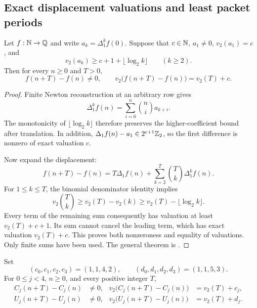 \subsection{Exact displacement valuations and least packet periods}

\begin{lemma}\label{lem:arith-dominance}
Let $f:\mathbb N\to\mathbb Q$ and write $a_k=\Delta_1^kf(0)$.  Suppose that $c\in\mathbb N$,
$a_1\ne0$, $v_2(a_1)=c$, and
\[
 v_2(a_k)\ge c+1+\lfloor\log_2k\rfloor\qquad(k\ge2).
\]
Then for every $n\ge0$ and $T>0$,
\[
 f(n+T)-f(n)\ne0,\qquad
 v_2\bigl(f(n+T)-f(n)\bigr)=v_2(T)+c.
\]
\end{lemma}

\begin{proof}
Finite Newton reconstruction at an arbitrary row gives
\[
 \Delta_1^kf(n)=\sum_{i=0}^{n}\binom ni a_{k+i}.
\]
The monotonicity of $\lfloor\log_2k\rfloor$ therefore preserves the
higher-coefficient bound after translation.  In addition,
$\Delta_1f(n)-a_1\in2^{c+1}\mathbb Z_2$, so the first difference is nonzero
of exact valuation $c$.

Now expand the displacement:
\[
 f(n+T)-f(n)=T\Delta_1f(n)
          +\sum_{k=2}^{T}\binom Tk\Delta_1^kf(n).
\]
For $1\le k\le T$, the binomial denominator identity implies
\[
 v_2\binom Tk\ge v_2(T)-v_2(k)
            \ge v_2(T)-\lfloor\log_2k\rfloor.
\]
Every term of the remaining sum consequently has valuation at least
$v_2(T)+c+1$.  Its sum cannot cancel the leading term, which has exact
valuation $v_2(T)+c$.  This proves both nonzeroness and equality of
valuations.  Only finite sums have been used.
The general theorem is
.
\end{proof}

\begin{theorem}\label{thm:arith-exact}
Set
\[
 (c_0,c_1,c_2,c_3)=(1,1,4,2),\qquad
 (d_0,d_1,d_2,d_3)=(1,1,5,3).
\]
For $0\le j<4$, $n\ge0$, and every positive integer $T$,
\begin{align*}
 C_j(n+T)-C_j(n)&\ne0,&
 v_2\bigl(C_j(n+T)-C_j(n)\bigr)&=v_2(T)+c_j,\\
 U_j(n+T)-U_j(n)&\ne0,&
 v_2\bigl(U_j(n+T)-U_j(n)\bigr)&=v_2(T)+d_j.
\end{align*}
\end{theorem}

